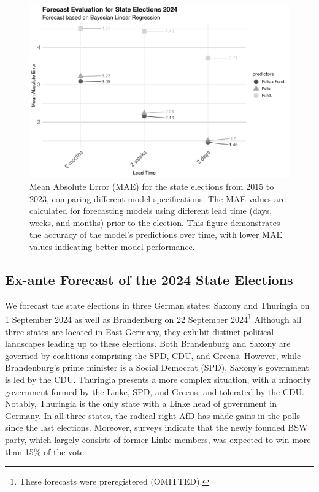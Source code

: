 \documentclass[doublespaced,12pt]{article}
\begin{document}
\begin{doublespacing}
\begin{figure}[t!]
    \centering
    \includegraphics[width=\textwidth]{fg4_fig_eval_bayes_mae-2.pdf}
    \caption{Mean Absolute Error (MAE) for the state elections from 2015 to 2023, comparing different model specifications. The MAE values are calculated for forecasting models using different lead time (days, weeks, and months) prior to the election. This figure demonstrates the accuracy of the model's predictions over time, with lower MAE values indicating better model performance.}
    \label{fig:model-evaluation-mae}
\end{figure}




\subsection{Ex-ante Forecast of the 2024 State Elections}



We forecast the state elections in three German states: Saxony and Thuringia on 1 September 2024 as well as Brandenburg on 22 September 2024\footnote{These forecasts were preregistered (OMITTED).} %
Although all three states are located in East Germany, they exhibit distinct political landscapes leading up to these elections. Both Brandenburg and Saxony are governed by coalitions comprising the SPD, CDU, and Greens. However, while Brandenburg's prime minister is a Social Democrat (SPD), Saxony's government is led by the CDU. Thuringia presents a more complex situation, with a minority government formed by the Linke, SPD, and Greens, and tolerated by the CDU. Notably, Thuringia is the only state with a Linke head of government in Germany. In all three states, the radical-right AfD has made gains in the polls since the last elections. Moreover, surveys indicate that the newly founded BSW party, which largely consists of former Linke members, was expected to win more than 15\% of the vote.


\end{doublespacing}
\end{document}
